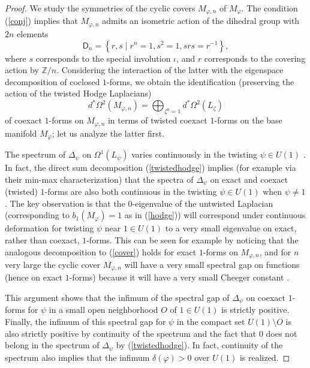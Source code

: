 \documentclass[10pt,a4paper]{amsart}
\begin{document}
\begin{proof} We study the symmetries of the cyclic covers $M_{\varphi,n}$ of $M_\varphi$. The condition (\ref{conj}) implies that $M_{\varphi,n}$ admits an isometric action of the dihedral group with $2n$ elements
\begin{equation*}
\mathsf{D}_n=\left\{r,s\mid r^n=1, s^2=1, srs=r^{-1}\right\},
\end{equation*}
where $s$ corresponds to the special involution $\iota$, and $r$ corresponds to the covering action by $\mathbb{Z}/n$. Considering the interaction of the latter with the eigenspace decomposition of coclosed $1$-forms, we obtain the identification (preserving the action of the twisted Hodge Laplacians)
\begin{equation}\label{cover}
d^*\Omega^2(M_{\varphi,n})=\bigoplus_{\zeta^n=1}d^*\Omega^2(L_\zeta)
\end{equation}
of coexact $1$-forms on $M_{\varphi,n}$ in terms of twisted coexact $1$-forms on the base manifold $M_\varphi$; let us analyze the latter first.
\par
The spectrum of $\Delta_\psi$ on $\Omega^1(L_\psi)$ varies continuously in the twisting $\psi\in U(1)$ \cite{Kat}. In fact, the direct sum decomposition (\ref{twistedhodge}) implies (for example via their min-max characterization) that the spectra of $\Delta_\psi$ on exact and coexact (twisted) $1$-forms are also both continuous in the twisting $\psi\in U(1)$ when $\psi\neq 1$. The key observation is that the $0$-eigenvalue of the untwisted Laplacian (corresponding to $b_1(M_\varphi) = 1$ as in (\ref{hodge})) will correspond under continuous deformation for twisting $\psi$ near $1\in U(1)$ to a very small eigenvalue on exact, rather than coexact, $1$-forms. This can be seen for example by noticing that the analogous decomposition to (\ref{cover}) holds for exact $1$-forms on $M_{\varphi,n}$, and for $n$ very large the cyclic cover $M_{\varphi,n}$ will have a very small spectral gap on functions (hence on exact $1$-forms) because it will have a very small Cheeger constant \cite{Cha}.
\par
This argument shows that the infimum of the spectral gap of $\Delta_{\psi}$ on coexact $1$-forms for $\psi$ in a small open neighborhood $O$ of $1\in U(1)$ is strictly positive. Finally, the infimum of this spectral gap for $\psi$ in the compact set $U(1)\setminus O$ is also strictly positive by continuity of the spectrum and the fact that $0$ does not belong in the spectrum of $\Delta_\psi$ by (\ref{twistedhodge}). In fact, continuity of the spectrum also implies that the infimum $\delta(\varphi)>0$ over $U(1)$ is realized.

\end{proof}
\end{document}
